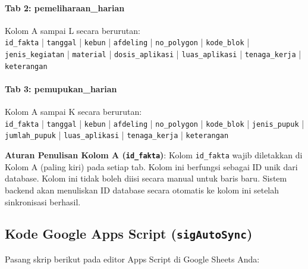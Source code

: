 \documentclass[12pt, a4paper]{article}
\begin{document}
\paragraph{Tab 2: pemeliharaan\_harian}
Kolom A sampai L secara berurutan: \\
\texttt{id\_fakta} | \texttt{tanggal} | \texttt{kebun} | \texttt{afdeling} | \texttt{no\_polygon} | \texttt{kode\_blok} | \texttt{jenis\_kegiatan} | \texttt{material} | \texttt{dosis\_aplikasi} | \texttt{luas\_aplikasi} | \texttt{tenaga\_kerja} | \texttt{keterangan}

\paragraph{Tab 3: pemupukan\_harian}
Kolom A sampai K secara berurutan: \\
\texttt{id\_fakta} | \texttt{tanggal} | \texttt{kebun} | \texttt{afdeling} | \texttt{no\_polygon} | \texttt{kode\_blok} | \texttt{jenis\_pupuk} | \texttt{jumlah\_pupuk} | \texttt{luas\_aplikasi} | \texttt{tenaga\_kerja} | \texttt{keterangan}

\textbf{Aturan Penulisan Kolom A (\texttt{id\_fakta})}: Kolom \texttt{id\_fakta} wajib diletakkan di Kolom A (paling kiri) pada setiap tab. Kolom ini berfungsi sebagai ID unik dari database. Kolom ini tidak boleh diisi secara manual untuk baris baru. Sistem backend akan menuliskan ID database secara otomatis ke kolom ini setelah sinkronisasi berhasil.

\subsection{Kode Google Apps Script (\texttt{sigAutoSync})}
Pasang skrip berikut pada editor Apps Script di Google Sheets Anda:
\end{document}
